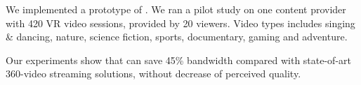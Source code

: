 \vspace{0.2cm}
We implemented a prototype of \name.
We ran a pilot study on one content provider with 420 VR video sessions, provided by 20 viewers. Video types includes singing \& dancing, nature, science fiction, sports, documentary, gaming and adventure.

Our experiments show that \name can save 45\% bandwidth compared with state-of-art 360-video streaming solutions, without decrease of perceived quality.

